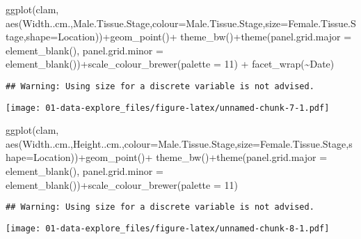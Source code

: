 \documentclass[
]{article}
\newenvironment{Shaded}{\begin{snugshade}}{\end{snugshade}}
\newcommand{\AttributeTok}[1]{\textcolor[rgb]{0.77,0.63,0.00}{#1}}
\newcommand{\DecValTok}[1]{\textcolor[rgb]{0.00,0.00,0.81}{#1}}
\newcommand{\FunctionTok}[1]{\textcolor[rgb]{0.00,0.00,0.00}{#1}}
\newcommand{\NormalTok}[1]{#1}
\newcommand{\SpecialCharTok}[1]{\textcolor[rgb]{0.00,0.00,0.00}{#1}}
\newcommand{\StringTok}[1]{\textcolor[rgb]{0.31,0.60,0.02}{#1}}
\begin{document}
\begin{Shaded}
\begin{Highlighting}[]
\FunctionTok{ggplot}\NormalTok{(clam, }\FunctionTok{aes}\NormalTok{(}\StringTok{\textasciigrave{}}\AttributeTok{Width..cm.}\StringTok{\textasciigrave{}}\NormalTok{,}\StringTok{\textasciigrave{}}\AttributeTok{Male.Tissue.Stage}\StringTok{\textasciigrave{}}\NormalTok{,}\AttributeTok{colour=}\StringTok{\textasciigrave{}}\AttributeTok{Male.Tissue.Stage}\StringTok{\textasciigrave{}}\NormalTok{,}\AttributeTok{size=}\StringTok{\textasciigrave{}}\AttributeTok{Female.Tissue.Stage}\StringTok{\textasciigrave{}}\NormalTok{,}\AttributeTok{shape=}\NormalTok{Location))}\SpecialCharTok{+}\FunctionTok{geom\_point}\NormalTok{()}\SpecialCharTok{+}
\FunctionTok{theme\_bw}\NormalTok{()}\SpecialCharTok{+}\FunctionTok{theme}\NormalTok{(}\AttributeTok{panel.grid.major =} \FunctionTok{element\_blank}\NormalTok{(),}
                \AttributeTok{panel.grid.minor =} \FunctionTok{element\_blank}\NormalTok{())}\SpecialCharTok{+}\FunctionTok{scale\_colour\_brewer}\NormalTok{(}\AttributeTok{palette =} \DecValTok{11}\NormalTok{) }\SpecialCharTok{+}
  \FunctionTok{facet\_wrap}\NormalTok{(}\SpecialCharTok{\textasciitilde{}}\NormalTok{Date)}
\end{Highlighting}
\end{Shaded}

\begin{verbatim}
## Warning: Using size for a discrete variable is not advised.
\end{verbatim}

\texttt{[image: 01-data-explore\_files/figure-latex/unnamed-chunk-7-1.pdf]}

\begin{Shaded}
\begin{Highlighting}[]
\FunctionTok{ggplot}\NormalTok{(clam, }\FunctionTok{aes}\NormalTok{(}\StringTok{\textasciigrave{}}\AttributeTok{Width..cm.}\StringTok{\textasciigrave{}}\NormalTok{,}\StringTok{\textasciigrave{}}\AttributeTok{Height..cm.}\StringTok{\textasciigrave{}}\NormalTok{,}\AttributeTok{colour=}\StringTok{\textasciigrave{}}\AttributeTok{Male.Tissue.Stage}\StringTok{\textasciigrave{}}\NormalTok{,}\AttributeTok{size=}\StringTok{\textasciigrave{}}\AttributeTok{Female.Tissue.Stage}\StringTok{\textasciigrave{}}\NormalTok{,}\AttributeTok{shape=}\NormalTok{Location))}\SpecialCharTok{+}\FunctionTok{geom\_point}\NormalTok{()}\SpecialCharTok{+}
\FunctionTok{theme\_bw}\NormalTok{()}\SpecialCharTok{+}\FunctionTok{theme}\NormalTok{(}\AttributeTok{panel.grid.major =} \FunctionTok{element\_blank}\NormalTok{(),}
                \AttributeTok{panel.grid.minor =} \FunctionTok{element\_blank}\NormalTok{())}\SpecialCharTok{+}\FunctionTok{scale\_colour\_brewer}\NormalTok{(}\AttributeTok{palette =} \DecValTok{11}\NormalTok{)}
\end{Highlighting}
\end{Shaded}

\begin{verbatim}
## Warning: Using size for a discrete variable is not advised.
\end{verbatim}

\texttt{[image: 01-data-explore\_files/figure-latex/unnamed-chunk-8-1.pdf]}
\end{document}
